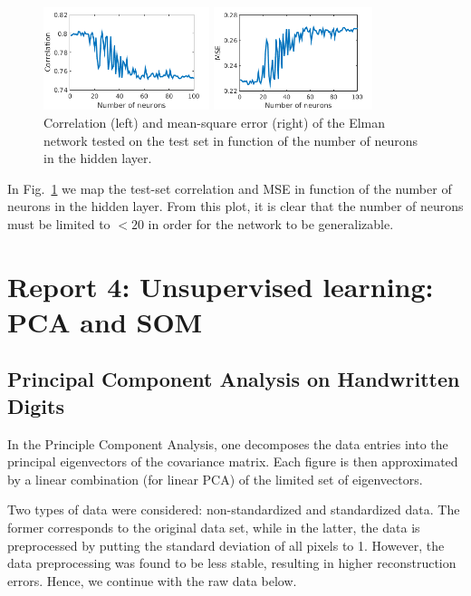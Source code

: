 \documentclass[pdftex,11pt,a4paper]{article}
\begin{document}
\begin{figure}[htb]
\centering
\begin{minipage}{0.4\textwidth}
\includegraphics[height=3cm]{figs/correlation_map.png}
\end{minipage}%
\begin{minipage}{0.4\textwidth}
\includegraphics[height=3cm]{figs/mse_map.png}
\end{minipage}%
\caption{Correlation (left) and mean-square error (right) of the Elman network tested on the test set in function of the number of neurons in the hidden layer. \label{fig:elman}}
\end{figure}

In Fig.~\ref{fig:elman} we map the test-set correlation and MSE in function of the number of neurons in the hidden layer. From this plot, it is clear that the number of neurons must be limited to $< 20$ in order for the network to be generalizable.


\FloatBarrier

\newpage
\section{Report 4: Unsupervised learning: PCA and SOM}

\subsection{Principal Component Analysis on Handwritten Digits}
In the Principle Component Analysis, one decomposes the data entries into the principal eigenvectors of the covariance matrix. Each figure is then approximated by a linear combination (for linear PCA) of the limited set of eigenvectors. 

Two types of data were considered: non-standardized and standardized data. The former corresponds to the original data set, while in the latter, the data is preprocessed by putting the standard deviation of all pixels to 1. However, the data preprocessing was found to be less stable, resulting in higher reconstruction errors. Hence, we continue with the raw data below.
\end{document}
